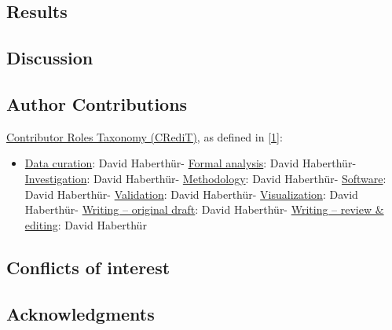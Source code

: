 \hypertarget{results}{%
\subsection{Results}\label{results}}

\hypertarget{discussion}{%
\subsection{Discussion}\label{discussion}}

\hypertarget{author-contributions}{%
\subsection{Author Contributions}\label{author-contributions}}

\href{https://credit.niso.org/}{Contributor Roles Taxonomy (CRediT)}, as defined in {[}\protect\hyperlink{ref-11ofsO2hq}{1}{]}:

\begin{itemize}
\tightlist
\item
  \href{https://credit.niso.org/contributor-roles/data-curation/}{Data curation}: David Haberthür- \href{https://credit.niso.org/contributor-roles/formal-analysis/}{Formal analysis}: David Haberthür- \href{https://credit.niso.org/contributor-roles/investigation/}{Investigation}: David Haberthür- \href{https://credit.niso.org/contributor-roles/methodology/}{Methodology}: David Haberthür- \href{https://credit.niso.org/contributor-roles/software/}{Software}: David Haberthür- \href{https://credit.niso.org/contributor-roles/validation/}{Validation}: David Haberthür- \href{https://credit.niso.org/contributor-roles/visualization/}{Visualization}: David Haberthür- \href{https://credit.niso.org/contributor-roles/writing---original-draft/}{Writing -- original draft}: David Haberthür- \href{https://credit.niso.org/contributor-roles/writing---review-\&-editing/}{Writing -- review \& editing}: David Haberthür
\end{itemize}

\hypertarget{conflicts-of-interest}{%
\subsection{Conflicts of interest}\label{conflicts-of-interest}}

\hypertarget{acknowledgments}{%
\subsection{Acknowledgments}\label{acknowledgments}}

